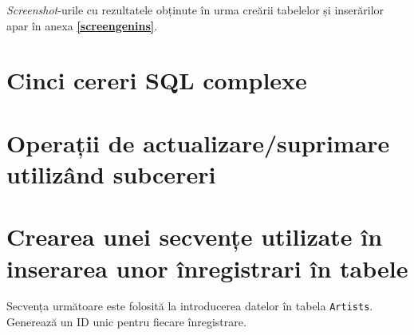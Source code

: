\documentclass[a4paper, oneside, 12pt]{article}
\begin{document}
\emph{Screenshot}-urile cu rezultatele obținute în urma creării tabelelor și
inserărilor apar în anexa \textbf{\ref{screengenins}}.

\section{Cinci cereri SQL complexe}

\begin{center}

\minipage{\linewidth}

\endminipage

\minipage{\linewidth}

\endminipage

\minipage{\linewidth}

\endminipage

\minipage{\linewidth}

\endminipage

\minipage{\linewidth}

\endminipage

\end{center}

\section{Operații de actualizare/suprimare utilizând subcereri}

\begin{center}

\minipage{\linewidth}

\endminipage

\end{center}

\section{Crearea unei secvențe utilizate în inserarea unor înregistrari în tabele}

Secvența următoare este folosită la introducerea datelor în tabela
\texttt{Artists}. Generează un ID unic pentru fiecare înregistrare.
\end{document}
